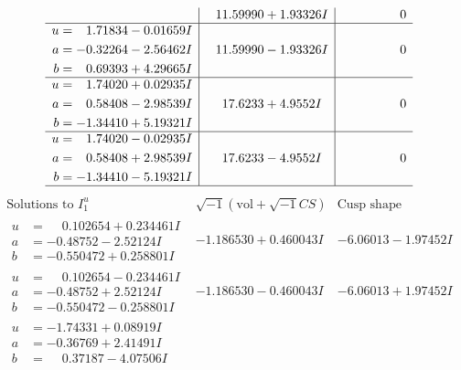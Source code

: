 \documentclass[1p]{elsarticle_modified}
\theoremstyle{definition}
\newcommand{\I}{\sqrt{-1}}
\begin{document}
$$\begin{array}{c|c|c}
 & \phantom{-}11.59990 + 1.93326 I & \phantom{-0.000000 } 0 \\ \hline\begin{aligned}
u &= \phantom{-}1.71834 - 0.01659 I \\
a &= -0.32264 - 2.56462 I \\
b &= \phantom{-}0.69393 + 4.29665 I\end{aligned}
 & \phantom{-}11.59990 - 1.93326 I & \phantom{-0.000000 } 0 \\ \hline\begin{aligned}
u &= \phantom{-}1.74020 + 0.02935 I \\
a &= \phantom{-}0.58408 - 2.98539 I \\
b &= -1.34410 + 5.19321 I\end{aligned}
 & \phantom{-}17.6233 + 4.9552 I & \phantom{-0.000000 } 0 \\ \hline\begin{aligned}
u &= \phantom{-}1.74020 - 0.02935 I \\
a &= \phantom{-}0.58408 + 2.98539 I \\
b &= -1.34410 - 5.19321 I\end{aligned}
 & \phantom{-}17.6233 - 4.9552 I & \phantom{-0.000000 } 0\\
 \hline 
 \end{array}$$\newpage$$\begin{array}{c|c|c}  
\text{Solutions to }I^u_{1}& \I (\text{vol} + \sqrt{-1}CS) & \text{Cusp shape}\\
 \hline 
\begin{aligned}
u &= \phantom{-}0.102654 + 0.234461 I \\
a &= -0.48752 - 2.52124 I \\
b &= -0.550472 + 0.258801 I\end{aligned}
 & -1.186530 + 0.460043 I & -6.06013 - 1.97452 I \\ \hline\begin{aligned}
u &= \phantom{-}0.102654 - 0.234461 I \\
a &= -0.48752 + 2.52124 I \\
b &= -0.550472 - 0.258801 I\end{aligned}
 & -1.186530 - 0.460043 I & -6.06013 + 1.97452 I \\ \hline\begin{aligned}
u &= -1.74331 + 0.08919 I \\
a &= -0.36769 + 2.41491 I \\
b &= \phantom{-}0.37187 - 4.07506 I\end{aligned}

\end{array}$$
\end{document}
